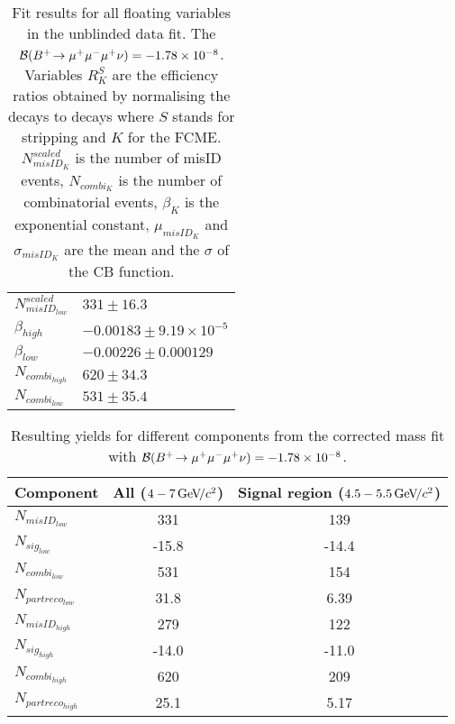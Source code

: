 \begin{table}[H]
\begin{tabular}{ l  l  }
$ N^{scaled}_{misID_{low}} $ & $331 \pm 16.3$ \\
$ \beta_{high} $ & $-0.00183 \pm 9.19\times 10^{-5}$ \\
$ \beta_{low} $ & $-0.00226 \pm 0.000129$ \\
$ N_{combi_{high}} $ & $620 \pm 34.3$ \\
$ N_{combi_{low}} $ & $531 \pm 35.4$ \\
\bottomrule
\end{tabular}
\caption{Fit results for all floating variables in the unblinded data fit. The $\mathcal{B}({{{B}^+}}\!\rightarrow {\ensuremath{\mu^+\mu^-\mu^+}}\nu) =-1.78\times 10^{-8}$. Variables $R^{S}_{K}$ are the efficiency ratios obtained by normalising the decays to \bjpsimumuk decays where $S$ stands for stripping and $K$ for the FCME. $N^{scaled}_{misID_{K}}$ is the number of misID events, $N_{combi_{K}}$ is the number of combinatorial events, $\beta_{K}$ is the exponential constant, $\mu_{misID_{K}}$ and $\sigma_{misID_{K}}$ are the mean and the $\sigma$ of the CB function.}
\label{tab:floatingparsummary_fit}
\end{table}

\begin{table}[H]
\begin{center}
\begin{tabular}{ l  c  c }
\toprule
Component &  All ($4-7 {\mathrm{\,Ge\kern -0.1em V\!/}c^2}$) & Signal region ($4.5-5.5{\mathrm{\,Ge\kern -0.1em V\!/}c^2}$)  \\
\hline
$N_{misID_{low}}$  &  331 & 139 \\
$N_{sig_{low}}$  & -15.8  & -14.4 \\
$N_{combi_{low}}$  & 531 & 154 \\
$N_{partreco_{low}}$  & 31.8 & 6.39 \\
\hline
$N_{misID_{high}}$  &  279 & 122 \\
$N_{sig_{high}}$  &-14.0 & -11.0  \\
$N_{combi_{high}}$  & 620 & 209 \\
$N_{partreco_{high}}$ & 25.1 & 5.17 \\
\bottomrule
\end{tabular}
\end{center}
\caption{Resulting yields for different components from the corrected mass fit with $\mathcal{B}({{{B}^+}}\!\rightarrow {\ensuremath{\mu^+\mu^-\mu^+}}\nu) =-1.78\times 10^{-8}$.}
\label{tab:yieldiatkos}
\end{table}


